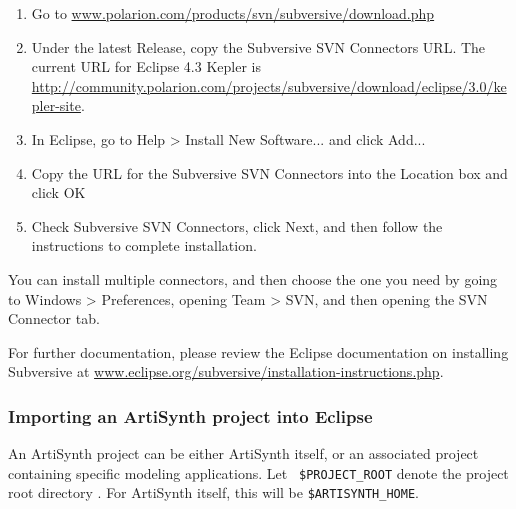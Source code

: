 \documentclass{article}
\def\directory{directory }
\begin{document}
\begin{enumerate}

\item  Go to 
\href{http://www.polarion.com/products/svn/subversive/download.php}
{www.polarion.com/products/svn/subversive/download.php}

\item Under the latest {\sf Release}, copy the Subversive SVN
Connectors URL. The current URL for Eclipse 4.3 Kepler
is \href{http://community.polarion.com/projects/subversive/download/eclipse/3.0/kepler-site/}
{http://community.polarion.com/projects/subversive/download/eclipse/3.0/kepler-site}.

\item In Eclipse, go to {\sf Help > Install New Software...} and 
click {\sf Add...}  

\item Copy the URL for the Subversive SVN Connectors into the {\sf
Location} box and click {\sf OK}

\item Check {\sf Subversive SVN Connectors}, click {\sf Next}, and
then follow the instructions to complete installation.

\end{enumerate}

You can install multiple connectors, and then choose the one you need
by going to {\sf Windows > Preferences}, opening {\sf Team > SVN}, and
then opening the {\sf SVN Connector} tab.

For further documentation, please review the Eclipse documentation on
installing Subversive at
\href{http://www.eclipse.org/subversive/installation-instructions.php}
{www.eclipse.org/subversive/installation-instructions.php}.

\subsubsection{Importing an ArtiSynth project into Eclipse}
\label{importingArtisynth}

An ArtiSynth project can be either ArtiSynth itself, or an associated
project containing specific modeling applications. Let {\tt
\$PROJECT\_ROOT} denote the project root \directory. For ArtiSynth
itself, this will be {\tt \$ARTISYNTH\_HOME}.
\end{document}
